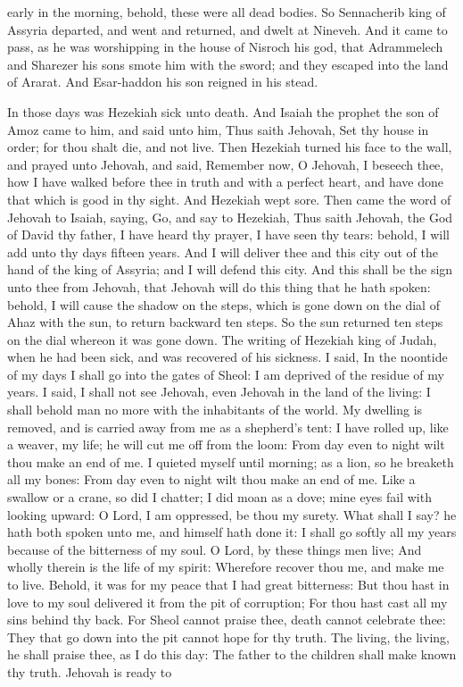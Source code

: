 early in the morning, behold, these were all dead bodies. So Sennacherib king of Assyria departed, and went and returned, and dwelt at Nineveh. And it came to pass, as he was worshipping in the house of Nisroch his god, that Adrammelech and Sharezer his sons smote him with the sword; and they escaped into the land of Ararat. And Esar-haddon his son reigned in his stead. 

In those days was Hezekiah sick unto death. And Isaiah the prophet the son of Amoz came to him, and said unto him, Thus saith Jehovah, Set thy house in order; for thou shalt die, and not live. Then Hezekiah turned his face to the wall, and prayed unto Jehovah, and said, Remember now, O Jehovah, I beseech thee, how I have walked before thee in truth and with a perfect heart, and have done that which is good in thy sight. And Hezekiah wept sore. Then came the word of Jehovah to Isaiah, saying, Go, and say to Hezekiah, Thus saith Jehovah, the God of David thy father, I have heard thy prayer, I have seen thy tears: behold, I will add unto thy days fifteen years. And I will deliver thee and this city out of the hand of the king of Assyria; and I will defend this city. And this shall be the sign unto thee from Jehovah, that Jehovah will do this thing that he hath spoken: behold, I will cause the shadow on the steps, which is gone down on the dial of Ahaz with the sun, to return backward ten steps. So the sun returned ten steps on the dial whereon it was gone down.  The writing of Hezekiah king of Judah, when he had been sick, and was recovered of his sickness.  I said, In the noontide of my days I shall go into the gates of Sheol: I am deprived of the residue of my years.  I said, I shall not see Jehovah, even Jehovah in the land of the living: I shall behold man no more with the inhabitants of the world.  My dwelling is removed, and is carried away from me as a shepherd’s tent: I have rolled up, like a weaver, my life; he will cut me off from the loom: From day even to night wilt thou make an end of me.  I quieted myself until morning; as a lion, so he breaketh all my bones: From day even to night wilt thou make an end of me.  Like a swallow or a crane, so did I chatter; I did moan as a dove; mine eyes fail with looking upward: O Lord, I am oppressed, be thou my surety.  What shall I say? he hath both spoken unto me, and himself hath done it: I shall go softly all my years because of the bitterness of my soul.  O Lord, by these things men live; And wholly therein is the life of my spirit: Wherefore recover thou me, and make me to live.  Behold, it was for my peace that I had great bitterness: But thou hast in love to my soul delivered it from the pit of corruption; For thou hast cast all my sins behind thy back.  For Sheol cannot praise thee, death cannot celebrate thee: They that go down into the pit cannot hope for thy truth.  The living, the living, he shall praise thee, as I do this day: The father to the children shall make known thy truth.  Jehovah is ready to 